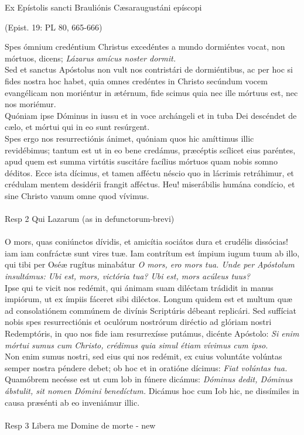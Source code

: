 \documentclass[options]{article}
\begin{document}
	Ex Epístolis sancti Brauliónis Cæsaraugustáni epíscopi
	\begin{flushright}
		(Epist. 19: PL 80, 665-666)
	\end{flushright}
Spes ómnium  credéntium Christus excedéntes a mundo dormiéntes vocat, non mórtuos, dicens;
\emph{Lázarus amícus noster dormit.}\\
Sed et sanctus Apóstolus non vult nos contristári de dormiéntibus, ac per hoc si fides nostra hoc habet, quia omnes credéntes in Christo secúndum vocem evangélicam non moriéntur in ætérnum, fide scimus quia nec ille mórtuus est, nec nos moriémur.\\
Quóniam ipse Dóminus in iussu et in voce archángeli et in tuba Dei descéndet de cælo, et mórtui qui in eo sunt resúrgent.\\
Spes ergo nos resurrectiónis ánimet, quóniam quos hic amíttimus illic revidébimus; tantum est ut in eo bene credámus, præcéptis scílicet eius paréntes, apud quem est summa virtútis suscitáre facílius mórtuos quam nobis somno déditos. Ecce ista dícimus, et tamen afféctu néscio quo in lácrimis retráhimur, et crédulam mentem desidérii frangit afféctus. Heu! miserábilis humána condício, et sine Christo vanum omne quod vívimus.\\
\\
Resp 2 Qui Lazarum (as in defunctorum-brevi)\\
\\
O mors, quas coniúnctos dívidis, et amicítia sociátos dura et crudélis dissócias! iam iam confráctæ sunt vires tuæ. Iam contrítum est ímpium iugum tuum ab illo, qui tibi per Oséæ  rugítus minabátur 
\emph{O mors, ero mors tua. Unde per Apóstolum insultámus: Ubi est, mors, victória tua? Ubi est, mors acúleus tuus?}\\
Ipse qui te vicit nos redémit, qui ánimam suam diléctam trádidit in manus impiórum, ut ex ímpiis fáceret sibi diléctos. Longum quidem est et multum quæ ad consolatiónem commúnem de divínis Scriptúris débeant replicári. Sed suffíciat nobis spes resurrectiónis et oculórum nostrórum diréctio ad glóriam nostri Redemptóris, in quo nos fide iam resurrexísse putámus, dicénte Apóstolo:
\emph{Si enim mórtui sumus cum Christo, crédimus quia simul étiam vívimus cum ipso.}\\
 Non enim sumus nostri, sed eius qui nos redémit, ex cuius voluntáte volúntas semper nostra péndere debet; ob hoc et in oratióne dícimus:
 \emph{Fiat volúntas tua.}
 Quamóbrem necésse est ut cum lob in fúnere dicámus:
\emph{Dóminus dedit, Dóminus ábstulit, sit nomen Dómini benedíctum.}
 Dicámus hoc cum Iob hic, ne dissímiles in causa præsénti ab eo inveniámur illic.
 \\
 \\
 Resp 3 Libera me Domine de morte - new
 
\end{document}
